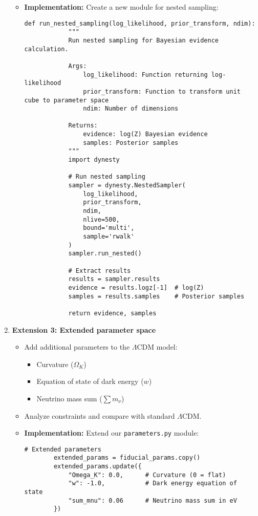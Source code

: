 \documentclass[11pt]{article}
\begin{document}
\begin{enumerate}
\begin{itemize}
        \item \textbf{Implementation:} Create a new module for nested sampling:
        \begin{lstlisting}[basicstyle=\small\ttfamily]
        def run_nested_sampling(log_likelihood, prior_transform, ndim):
            """
            Run nested sampling for Bayesian evidence calculation.
            
            Args:
                log_likelihood: Function returning log-likelihood
                prior_transform: Function to transform unit cube to parameter space
                ndim: Number of dimensions
                
            Returns:
                evidence: log(Z) Bayesian evidence
                samples: Posterior samples
            """
            import dynesty
            
            # Run nested sampling
            sampler = dynesty.NestedSampler(
                log_likelihood,
                prior_transform,
                ndim,
                nlive=500,
                bound='multi',
                sample='rwalk'
            )
            sampler.run_nested()
            
            # Extract results
            results = sampler.results
            evidence = results.logz[-1]  # log(Z)
            samples = results.samples    # Posterior samples
            
            return evidence, samples
        \end{lstlisting}
    \end{itemize}
    
    \item \textbf{Extension 3: Extended parameter space}
    \begin{itemize}
        \item Add additional parameters to the $\Lambda$CDM model:
            \begin{itemize}
                \item Curvature ($\Omega_K$)
                \item Equation of state of dark energy ($w$)
                \item Neutrino mass sum ($\sum m_\nu$)
            \end{itemize}
        \item Analyze constraints and compare with standard $\Lambda$CDM.
        
        \item \textbf{Implementation:} Extend our \texttt{parameters.py} module:
        \begin{lstlisting}[basicstyle=\small\ttfamily]
        # Extended parameters
        extended_params = fiducial_params.copy()
        extended_params.update({
            "Omega_K": 0.0,      # Curvature (0 = flat)
            "w": -1.0,           # Dark energy equation of state
            "sum_mnu": 0.06      # Neutrino mass sum in eV
        })
        

\end{lstlisting}
\end{itemize}
\end{enumerate}
\end{document}
